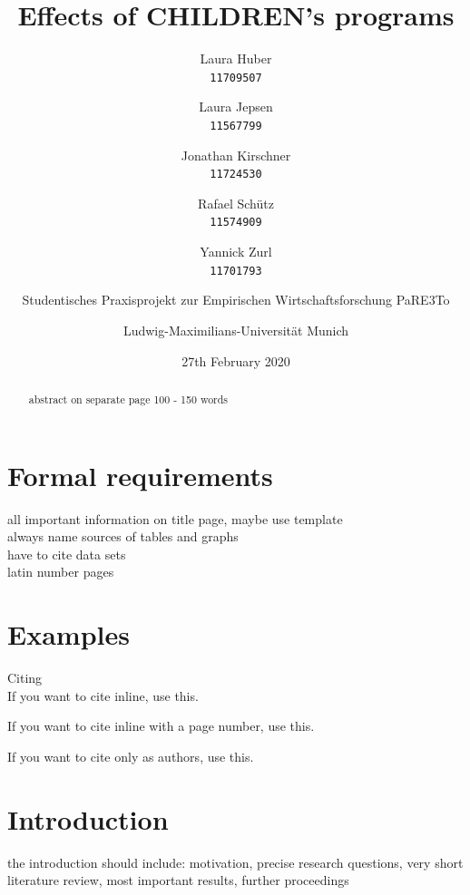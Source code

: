 \documentclass[12pt, a4paper, titlepage]{article}\usepackage[]{graphicx}\usepackage[]{color}
\title{Effects of CHILDREN's programs}
\author{
Laura Huber\\
\texttt{11709507}
\and
Laura Jepsen\\
\texttt{11567799}
\and
Jonathan Kirschner\\
\texttt{11724530}
\and
Rafael Schütz\\
\texttt{11574909} 
\and 
Yannick Zurl\\
\texttt{11701793}
\and
Studentisches Praxisprojekt zur Empirischen Wirtschaftsforschung PaRE3To\\
\and
Ludwig-Maximilians-Universität Munich
}
\date{27th February 2020}
\begin{document}
\maketitle

\tableofcontents
\listoftables

\listoffigures

\begin{abstract} 
abstract on separate page
100 - 150 words
\end{abstract}

\section{Formal requirements}
all important information on title page, maybe use template\\
always name sources of tables and graphs\\
have to cite data sets\\
latin number pages\\


\section{Examples}

Citing\\

If you want to cite \textcite{Millstein.2020} inline, use this.

If you want to cite \parencite[p.4]{Millstein.2020} inline with a page number, use this.

If you want to cite \citeauthor{Millstein.2020} only as authors, use this.


\section{Introduction}

the introduction should include: motivation, precise research questions, very short literature review, most important results, further proceedings
\end{document}
